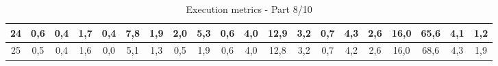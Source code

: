 \begin{sidewaystable}[]
\begin{tabular}{|c|c|c|c|c|c|c|c|c|c|c|c|c|c|c|c|c|c|c|c|}
    24 & 0,6                                             & 0,4                                             & 1,7                                             & 0,4                                             & 7,8                                              & 1,9                                              & 2,0                                              & 5,3                                              & 0,6                                              & 4,0                                              & 12,9                                             & 3,2                                              & 0,7                                              & 4,3                                              & 2,6                                              & 16,0                                             & 65,6                                             & 4,1                                              & 1,2                                              \\ \hline
    25 & 0,5                                             & 0,4                                             & 1,6                                             & 0,0                                             & 5,1                                              & 1,3                                              & 0,5                                              & 1,9                                              & 0,6                                              & 4,0                                              & 12,8                                             & 3,2                                              & 0,7                                              & 4,2                                              & 2,6                                              & 16,0                                             & 68,6                                             & 4,3                                              & 1,9                                              \\ \hline
    \end{tabular}
    \caption{Execution metrics - Part 8/10}
    \label{tab:ap:exec_metrics_8}
\end{sidewaystable}

